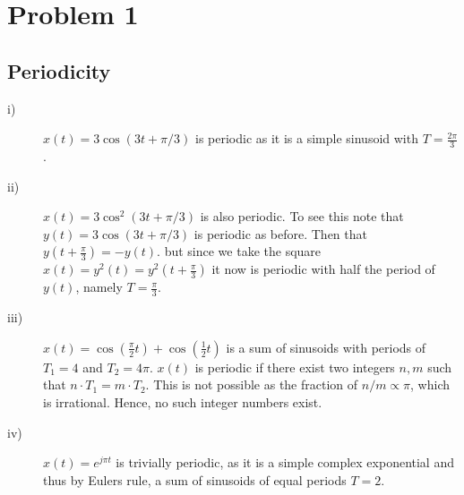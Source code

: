 \section*{Problem 1}
\subsection*{Periodicity}
\begin{description}
    \item[i)] $x(t) = 3\cos(3t + \pi/3)$ is periodic as it is a simple sinusoid with $T=\frac{2\pi}{3}$.
    \item[ii)] $x(t) = 3\cos^2(3t + \pi/3)$ is also periodic. To see this note that $y(t) = 3\cos(3t + \pi/3)$ is periodic as before. Then that $y(t + \frac{\pi}{3}) = -y(t)$. but since we take the square $x(t) = y^2(t) = y^2(t + \frac{\pi}{3})$ it now is periodic with half the period of $y(t)$, namely $T=\frac{\pi}{3}$.
\item[iii)] $x(t) = \cos(\frac{\pi}{2}t) + \cos(\frac{1}{2}t)$ is a sum of sinusoids with periods of $T_1 = 4$ and $T_2 = 4\pi$. $x(t)$ is periodic if there exist two integers $n,m$ such that $n\cdot T_1 = m\cdot T_2$. This is not possible as the fraction of $n/m \propto \pi$, which is irrational. Hence, no such integer numbers exist.

\item[iv)] $x(t) = e^{j\pi t}$ is trivially periodic, as it is a simple complex exponential and thus by Eulers rule, a sum of sinusoids of equal periods $T=2$.
\end{description}


